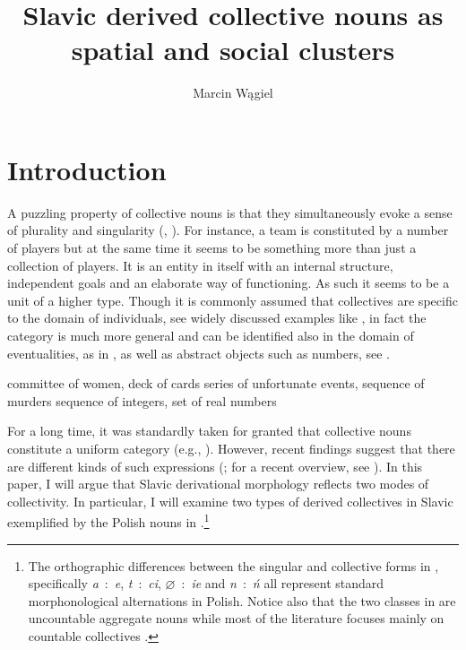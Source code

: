 \documentclass[output=paper]{langscibook}
\author{Marcin Wągiel\affiliation{Masaryk University}}
\title{Slavic derived collective nouns as spatial and social clusters}
\begin{document}
\maketitle

\section{Introduction}\label{wan:sec:introduction}

A puzzling property of collective nouns is that they simultaneously evoke a sense of plurality and singularity (\citealt[195]{jespersen1924philosophy}, \citealt{gil1996maltese}). For instance, a team is constituted by a number of players but at the same time it seems to be something more than just a collection of players. It is an entity in itself with an internal structure, independent goals and an elaborate way of functioning. As such it seems to be a unit of a higher type. Though it is commonly assumed that collectives are specific to the domain of individuals, see widely discussed examples like , in fact the category is much more general and can be identified also in the domain of eventualities, as in , as well as abstract objects such as numbers, see .

\ea \ea committee of women, deck of cards\label{wan:ex:collectives-individuals}
\ex series of unfortunate events, sequence of murders\label{wan:ex:collectives-eventualities}
\ex sequence of integers, set of real numbers\label{wan:ex:collectives-numbers}
\z
\z

\noindent For a long time, it was standardly taken for granted that collective nouns constitute a uniform category (e.g., \citealt{landman1989groupsi,barker1992group,schwarzschild1996pluralities}). However, recent findings suggest that there are different kinds of such expressions (\citealt{joosten2010collective,pearson2011new,de_vries2015shifting,henderson2017swarms,zwarts2020contiguity}; for a recent overview, see \citealt{de_vries-toappear-collective}). In this paper, I will argue that Slavic derivational morphology reflects two modes of collectivity. In particular, I will examine two types of derived collectives in Slavic exemplified by the Polish nouns in .\footnote{The orthographic differences between the singular and collective forms in , specifically \textit{a}~:~\textit{e}, \textit{t}~:~\textit{ci}, $\varnothing$~:~\textit{ie} and \textit{n}~:~\textit{ń} all represent standard morphonological alternations in Polish. Notice also that the two classes in  are uncountable aggregate nouns while most of the literature focuses mainly on countable collectives \citep[but see][]{de_vries-toappear-collective}.}
\end{document}

